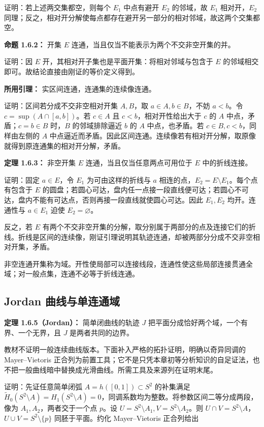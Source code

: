 \documentclass[11pt,a4paper]{article}
\begin{document}
证明：若上述两交集都空，则每个 \(E_1\) 中点有避开 \(E_2\) 的邻域，故
\(E_1\) 相对开，\(E_2\)
同理；反之，相对开分解使每点都存在避开另一部分的相对邻域，故这两个交集都空。

\textbf{命题 1.6.2：} 开集 \(E\)
连通，当且仅当不能表示为两个不交非空开集的并。

证明：因 \(E\) 开，其相对开子集也是平面开集：将相对邻域与包含于 \(E\)
的邻域相交即可。故结论直接由刚证的等价定义得到。

\textbf{所用引理：} 实区间连通，连通集的连续像连通。

证明：区间若分成不交非空相对开集 \(A,B\)，取 \(a\in A,b\in B\)，不妨
\(a<b\)。令 \(c=\sup(A\cap[a,b])\)。若 \(c\in A\) 且
\(c<b\)，相对开性给出大于 \(c\) 的 \(A\) 中点，矛盾；\(c=b\in B\)
时，\(B\) 的邻域排除逼近 \(b\) 的 \(A\) 中点，也矛盾。若
\(c\in B,c<b\)，同样由左侧的 \(A\)
中点逼近而矛盾。因此区间连通。连续像若有相对开分解，取原像就得到原连通集的相对开分解，矛盾。

\textbf{定理 1.6.3：} 非空开集 \(E\) 连通，当且仅当任意两点可用位于
\(E\) 中的折线连接。

证明：固定 \(a\in E\)，令 \(E_1\) 为可由这样的折线与 \(a\)
相连的点，\(E_2=E\setminus E_1\)。每个点有包含于 \(E\)
的圆盘；若圆心可达，盘内任一点接一段直线便可达；若圆心不可达，盘内不能有可达点，否则再接一段直线就使圆心可达。因此
\(E_1,E_2\) 均开。连通性与 \(a\in E_1\) 迫使 \(E_2=\varnothing\)。

反之，若 \(E\)
有两个不交非空开集的分解，取分别属于两部分的点及连接它们的折线。折线是区间的连续像，刚证引理说明其轨迹连通，却被两部分分成不交非空相对开集，矛盾。

非空连通开集称为域。开性使局部可以连接线段，连通性使这些局部连接贯通全域；对一般点集，连通不必等于折线连通。

\subsection{Jordan
曲线与单连通域}\label{jordan-ux66f2ux7ebfux4e0eux5355ux8fdeux901aux57df}

\textbf{定理 1.6.5（Jordan）：} 简单闭曲线的轨迹 \(J\)
把平面分成恰好两个域，一个有界、一个无界，且 \(J\) 是两者共同的边界。

教材不证明一般连续曲线版本。下面补入严格的拓扑证明，明确以奇异同调的
Mayer--Vietoris
正合列为前置工具；它不是只凭本章初等分析知识的自足证法，也不把一般曲线暗中替换成光滑曲线。所需工具及来源列在证明末尾。

证明：先证任意简单闭弧 \(A=h([0,1])\subset S^2\) 的补集满足
\(\widetilde H_0(S^2\setminus A)=H_1(S^2\setminus A)=0\)，同调系数均为整数。将参数区间二等分成两段，像为
\(A_1,A_2\)，两者交于一个点 \(p\)。设
\(U=S^2\setminus A_1,V=S^2\setminus A_2\)。则
\(U\cap V=S^2\setminus A\)，\(U\cup V=S^2\setminus\{p\}\)
同胚于平面。约化 Mayer--Vietoris 正合列给出
\end{document}

